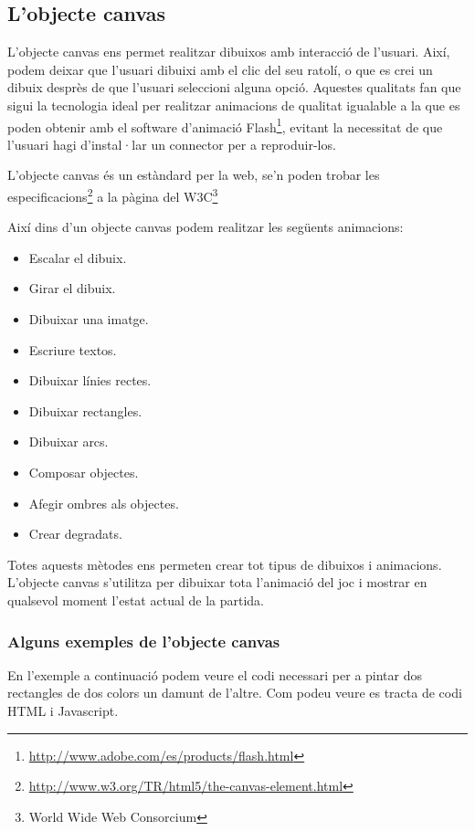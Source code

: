 \subsection{L'objecte canvas}

L'objecte canvas ens permet realitzar dibuixos amb interacció de l'usuari. Així, podem deixar que l'usuari dibuixi amb el clic del seu ratolí, o que es crei un dibuix desprès de que l'usuari seleccioni alguna opció. Aquestes qualitats fan que sigui la tecnologia ideal per realitzar animacions de qualitat igualable a la que es poden obtenir amb el software d'animació Flash\footnote{\url{http://www.adobe.com/es/products/flash.html}}, evitant la necessitat de que l'usuari hagi d'instal·lar un connector per a reproduir-los. 

L'objecte canvas és un estàndard per la web, se'n poden trobar les especificacions\footnote{\url{http://www.w3.org/TR/html5/the-canvas-element.html}} a la pàgina del W3C\footnote{World Wide Web Consorcium}

Així dins d'un objecte canvas podem realitzar les següents animacions: 

\begin{itemize}
\item{Escalar el dibuix.}
\item{Girar el dibuix.}
\item{Dibuixar una imatge.}
\item{Escriure textos.}
\item{Dibuixar línies rectes.}
\item{Dibuixar rectangles.}
\item{Dibuixar arcs.}
\item{Composar objectes.}
\item{Afegir ombres als objectes.}
\item{Crear degradats.}
\end{itemize}

Totes aquests mètodes ens permeten crear tot tipus de dibuixos i animacions. L'objecte canvas s'utilitza per dibuixar tota l'animació del joc i mostrar en qualsevol moment l'estat actual de la partida. 

\newpage

\subsubsection{Alguns exemples de l'objecte canvas}

En l'exemple a continuació podem veure el codi necessari per a pintar dos rectangles de dos colors un damunt de l'altre. Com podeu veure es tracta de codi HTML i Javascript.  


